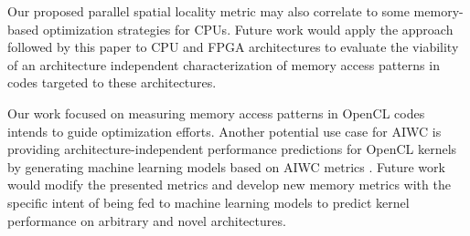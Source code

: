 \documentclass[review=false, sigchi]{acmart}
\begin{document}
	Our proposed parallel spatial locality metric may also correlate to some memory-based optimization strategies for CPUs. Future work would apply the approach followed by this paper to CPU and FPGA architectures to evaluate the viability of an architecture independent characterization of memory access patterns in codes targeted to these architectures.
	
	Our work focused on measuring memory access patterns in OpenCL codes intends to guide optimization efforts. Another potential use case for AIWC is providing architecture-independent performance predictions for OpenCL kernels by generating machine learning models based on AIWC metrics \cite{beauperformanceprediction}.  Future work would modify the presented metrics and develop new memory metrics with the specific intent of being fed to machine learning models to predict kernel performance on arbitrary and novel architectures. %
	
	
	
	
\end{document}
